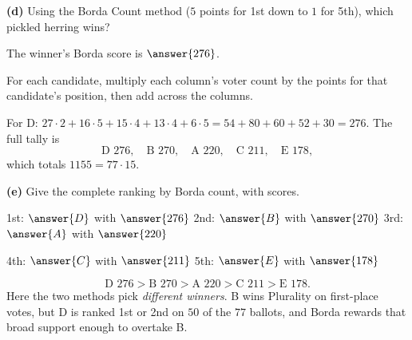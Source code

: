 \documentclass[12pt]{ximera}
\begin{document}
\begin{problem}
\begin{prompt}
\textbf{(d)} Using the Borda Count method ($5$ points for 1st down to $1$ for 5th),
which pickled herring wins?

\begin{multipleChoice}
\end{multipleChoice}

The winner's Borda score is $\answer{276}$.

\begin{hint}
For each candidate, multiply each column's voter count by the points for that
candidate's position, then add across the columns.
\end{hint}

\begin{feedback}
For D: $27\cdot 2+16\cdot 5+15\cdot 4+13\cdot 4+6\cdot 5=54+80+60+52+30=276$.
The full tally is
\[
\text{D } 276, \quad \text{B } 270, \quad \text{A } 220, \quad \text{C } 211, \quad \text{E } 178,
\]
which totals $1155=77\cdot 15$. \checkmark
\end{feedback}
\end{prompt}

\begin{prompt}
\textbf{(e)} Give the complete ranking by Borda count, with scores.

1st: $\answer{D}$ with $\answer{276}$ \quad 2nd: $\answer{B}$ with $\answer{270}$ \quad
3rd: $\answer{A}$ with $\answer{220}$

\smallskip
4th: $\answer{C}$ with $\answer{211}$ \quad 5th: $\answer{E}$ with $\answer{178}$

\begin{feedback}
\[ \text{D } 276 > \text{B } 270 > \text{A } 220 > \text{C } 211 > \text{E } 178. \]
Here the two methods pick \emph{different winners}. B wins Plurality on first-place
votes, but D is ranked 1st or 2nd on $50$ of the $77$ ballots, and Borda rewards that
broad support enough to overtake B.
\end{feedback}
\end{prompt}
\end{problem}
\end{document}
